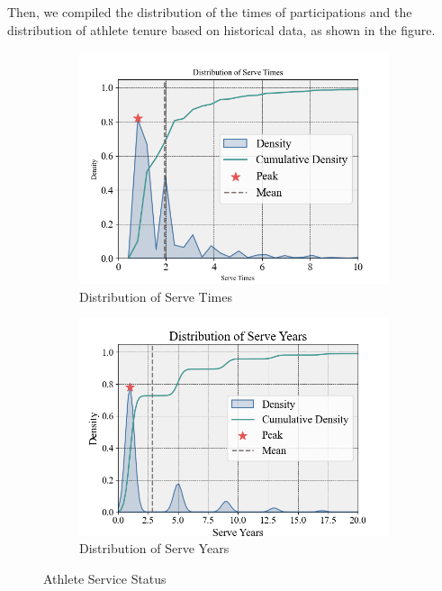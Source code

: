 \documentclass[12pt]{article}  %
\begin{document}
Then, we compiled the distribution of the times of participations and the distribution of athlete tenure based on historical data, as shown in the figure.
\begin{figure}[H]
	\centering
	\begin{subfigure}[b]{.48\textwidth}
		\includegraphics[width=\textwidth]{img/Times.png}
		\caption{Distribution of Serve Times}\label{subfig:left}
	\end{subfigure}
	\begin{subfigure}[b]{.51\textwidth}
		\includegraphics[width=\textwidth]{img/Years.png}
		\caption{Distribution of Serve Years}\label{subfig:right}
	\end{subfigure}
	\caption{Athlete Service Status}\label{fig:subfigures}
\end{figure}
\end{document}
